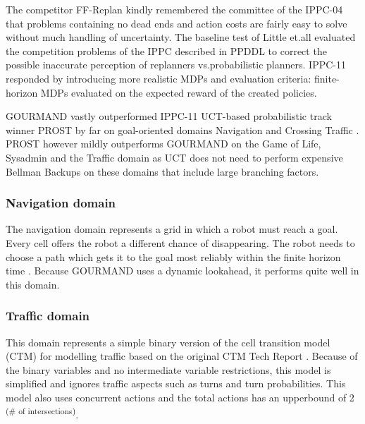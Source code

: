 \documentclass[runningheads,a4paper]{llncs}
\begin{document}
The competitor FF-Replan \cite{FFReplan} kindly remembered the committee of the IPPC-04 that problems containing no dead ends and action costs are fairly easy to solve without much handling of uncertainty. The baseline test of Little et.\@ all evaluated the competition problems of the IPPC described in PPDDL to correct the possible inaccurate perception of replanners vs.\@ probabilistic planners. IPPC-11 responded by introducing more realistic MDPs and evaluation criteria: finite-horizon MDPs evaluated on the expected reward of the created policies.

GOURMAND vastly outperformed IPPC-11 UCT-based probabilistic track winner PROST by far on goal-oriented domains Navigation and Crossing Traffic \cite{kolobov2012gourmand}. PROST however mildly outperforms GOURMAND on the Game of Life, Sysadmin and the Traffic domain as UCT does not need to perform expensive Bellman Backups on these domains that include large branching factors.

\subsubsection{Navigation domain}

The navigation domain represents a grid in which a robot must reach a goal. Every cell offers the robot a different chance of disappearing. The robot needs to choose a path which gets it to the goal most reliably within the finite horizon time \cite{sanner2011navigation}. Because GOURMAND uses a dynamic lookahead, it performs quite well in this domain.


\subsubsection{Traffic domain}
This domain represents a simple binary version of the cell transition model (CTM) for modelling traffic based on the original CTM Tech Report \cite{sanner2011traffic}. Because of the binary variables and no intermediate variable restrictions, this model is simplified and ignores traffic aspects such as turns and turn probabilities. This model also uses concurrent actions and the total actions has an upperbound of 2\textsuperscript{ (\# of intersections)}.


%
%
\end{document}
